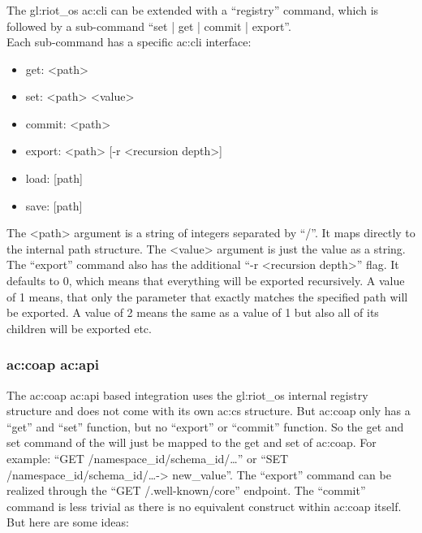 \subsubsection{}
\label{sec:design:integrating_external_configuration_managers:simple_configuration_managers:cli}

The \gls{gl:riot_os} \gls{ac:cli} can be extended with a ``registry'' command, which is followed by a sub-command ``set | get | commit | export''.\\
Each sub-command has a specific \gls{ac:cli} interface:

\begin{itemize}
    \item get: <path>
    \item set: <path> <value>
    \item commit: <path>
    \item export: <path> [-r <recursion depth>]
    \item load: [path]
    \item save: [path]
\end{itemize}

The <path> argument is a string of integers separated by ``/''.
It maps directly to the  internal path structure.
The <value> argument is just the value as a string.
The ``export'' command also has the additional ``-r <recursion depth>'' flag.
It defaults to 0, which means that everything will be exported recursively.
A value of 1 means, that only the parameter that exactly matches the specified path will be exported.
A value of 2 means the same as a value of 1 but also all of its children will be exported etc.

\subsubsection{\gls*{ac:coap} \gls*{ac:api}}
\label{sec:design:integrating_external_configuration_managers:coap}

The \gls{ac:coap} \gls*{ac:api} based integration uses the \gls{gl:riot_os} internal registry structure and does not come with its own \gls{ac:cs} structure.
But \gls{ac:coap} only has a ``get'' and ``set'' function, but no ``export'' or  ``commit'' function.
So the get and set command of the  will just be mapped to the get and set of \gls{ac:coap}.
For example: ``GET /namespace\_id/schema\_id/\dots'' or ``SET /namespace\_id/schema\_id/\dots -> new\_value''.
The ``export'' command can be realized through the ``GET /.well-known/core'' endpoint.
The ``commit'' command is less trivial as there is no equivalent construct within \gls{ac:coap} itself.
But here are some ideas:

